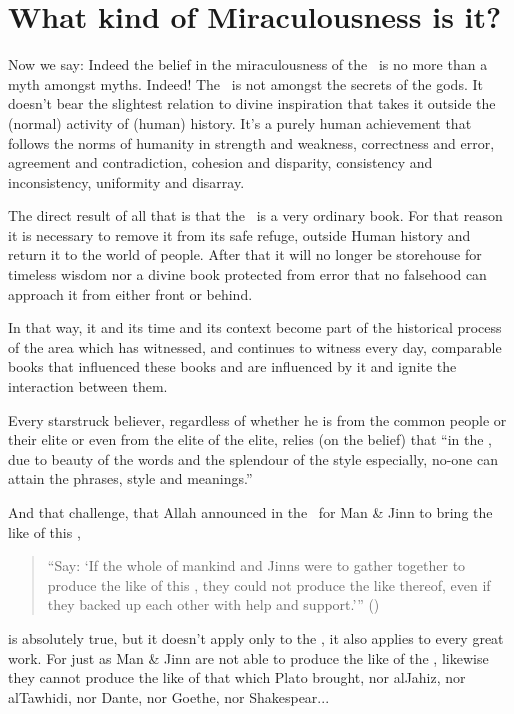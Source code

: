 \documentclass[12pt]{memoir}
\begin{document}


\section{What kind of Miraculousness is it?}

Now we say: Indeed the belief in the miraculousness of the \Quran\ is no more
than a myth amongst myths. Indeed! The \Quran\ is not amongst the secrets of the
gods. It doesn’t bear the slightest relation to divine inspiration that takes
it outside the (normal) activity of (human) history. It’s a purely human
achievement that follows the norms of humanity in strength and weakness,
correctness and error, agreement and contradiction, cohesion and disparity,
consistency and inconsistency, uniformity and disarray.

The direct result of all that is that the \Quran\ is a very ordinary book. For
that reason it is necessary to remove it from its safe refuge, outside Human
history and return it to the world of people. After that it will no longer be
storehouse for timeless wisdom nor a divine book protected from error that no
falsehood can approach it from either front or behind.

In that way, it and its time and its context become part of the historical
process of the area which has witnessed, and continues to witness every day,
comparable books that influenced these books and are influenced by it and
ignite the interaction between them.

Every star\–struck believer, regardless of whether he is from the common people
or their elite or even from the elite of the elite, relies (on the belief) that
“in the \Quran, due to beauty of the words and the splendour of the style
especially, no-one can attain the phrases, style and meanings.”\fnmark


And that challenge, that Allah announced in the \Quran\ for Man \& Jinn to bring
the like of this \Quran,

\begin{quote}
“Say: ‘If the whole of mankind and Jinns were to gather together
to produce the like of this \Quran, they could not produce the like thereof,
even if they backed up each other with help and support.’” ()
\end{quote}

is absolutely true, but it doesn’t apply only to the \Quran, it also applies to
every great work. For just as Man \& Jinn are not able to produce the like of
the \Quran, likewise they cannot produce the like of that which Plato brought,
nor al\–Jahiz, nor al\–Tawhidi, nor Dante, nor Goethe, nor Shakespear...
\end{document}
